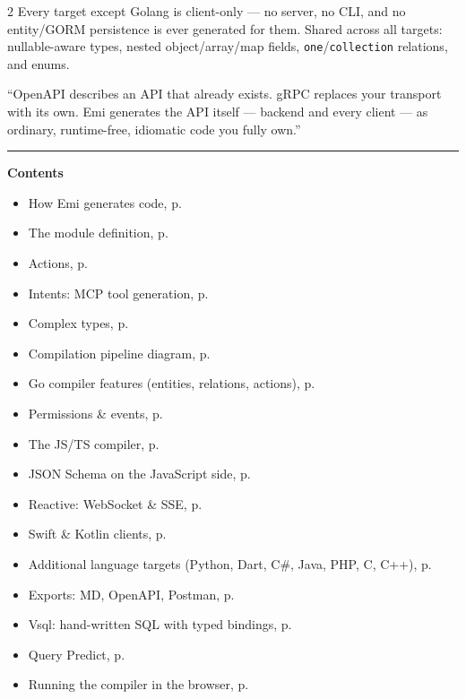 \documentclass[10pt,a4paper]{extarticle}
\newcommand{\headlinefont}{\normalfont\sffamily\bfseries\selectfont}
\newcommand{\thinrule}{\noindent\textcolor{rulegray}{\rule{\linewidth}{0.4pt}}}
\begin{document}
\begin{multicols}{2}
\raggedcolumns
Every target except Golang is client-only --- no server, no CLI, and no
entity/GORM persistence is ever generated for them. Shared across all
targets: nullable-aware types, nested object/array/map fields,
\texttt{one}/\texttt{collection} relations, and enums.

\begin{pullquote}
``OpenAPI describes an API that already exists. gRPC replaces your
transport with its own. Emi generates the API itself --- backend and
every client --- as ordinary, runtime-free, idiomatic code you fully
own.''
\end{pullquote}
\end{multicols}

\thinrule
\vspace{4pt}

{\headlinefont\large Contents}
\vspace{2pt}
\begin{itemize}[leftmargin=1.1em,itemsep=1pt,topsep=2pt]
  \item How Emi generates code, p.~\pageref{sec:overview}
  \item The module definition, p.~\pageref{sec:module-spec}
  \item Actions, p.~\pageref{sec:actions}
  \item Intents: MCP tool generation, p.~\pageref{sec:intents}
  \item Complex types, p.~\pageref{sec:complex-types}
  \item Compilation pipeline diagram, p.~\pageref{fig:pipeline}
  \item Go compiler features (entities, relations, actions), p.~\pageref{sec:go-compiler-features}
  \item Permissions \& events, p.~\pageref{sec:permissions-events}
  \item The JS/TS compiler, p.~\pageref{sec:js-compiler}
  \item JSON Schema on the JavaScript side, p.~\pageref{sec:json-schema}
  \item Reactive: WebSocket \& SSE, p.~\pageref{sec:reactive}
  \item Swift \& Kotlin clients, p.~\pageref{sec:swift-kotlin}
  \item Additional language targets (Python, Dart, C\#, Java, PHP, C, C++), p.~\pageref{sec:additional-targets}
  \item Exports: MD, OpenAPI, Postman, p.~\pageref{sec:exports}
  \item Vsql: hand-written SQL with typed bindings, p.~\pageref{sec:vsql}
  \item Query Predict, p.~\pageref{sec:query-predict}
  \item Running the compiler in the browser, p.~\pageref{sec:in-browser}
\end{itemize}
\end{document}
